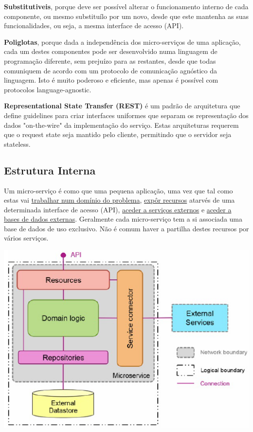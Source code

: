\documentclass{article}
\begin{document}
\pagebreak

\textbf{Substitutiveis},  porque deve ser possível alterar o funcionamento interno de cada componente, ou mesmo substituílo por
um novo, desde que este mantenha as suas funcionalidades, ou seja, a mesma interface de acesso (API).

\vspace{2mm}

\textbf{Poliglotas},  porque dada a independência dos micro-serviços de uma aplicação, cada um destes componentes pode
ser desenvolvido numa linguagem de programação diferente, sem prejuízo para as restantes, desde que todas
comuniquem de acordo com um protocolo de comunicação agnóstico da linguagem. Isto é muito poderoso e eficiente,
mas apenas é possível com protocolos language-agnostic.

\vspace{2mm}

\textbf{Representational State Transfer (REST)} é um padrão de arquitetura
que define guidelines para criar interfaces uniformes que separam
os representação dos dados "on-the-wire" da implementação do serviço.
Estas arquiteturas requerem que o request state seja mantido pelo cliente,
permitindo que o servidor seja stateless.

\subsection{Estrutura Interna}

Um micro-serviço é como que uma pequena aplicação, uma vez que tal como
estas vai \uline{trabalhar num domínio do problema}, \uline{expôr
recursos} atarvés de uma determinada interface de acesso (API), \uline{aceder
a serviços externos} e \uline{aceder a bases de dados externas}.
Geralmente cada micro-serviço tem a si associada uma base de dados de uso exclusivo. Não é
comum haver a partilha destes recursos por vários serviços.

\begin{center}
  \includegraphics[scale=0.5]{104}
\end{center}
\end{document}
